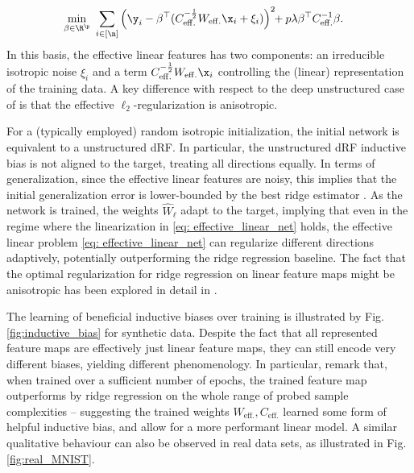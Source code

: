 \begin{align}
    \label{eq:def:erm_equiv}
    \underset{\beta\in\R^{\p}}{\min}~&\sum\limits_{i\in[\n]}\left(\y_{i}-\beta^\top(C_{\mathrm{eff.}}^{-\frac{1}{2}}W_{\mathrm{eff.}}\x_{i}+\xi_i)\right)^{2}\!\! +p\lambda\beta^{\top}C^{-1}_{\mathrm{eff.}}\beta.\notag
\end{align}
In this basis, the effective linear features has two components: an irreducible isotropic noise $\xi_{i}$ and a term $C^{-\frac{1}{2}}_{\mathrm{eff.}}W_{\mathrm{eff.}}\x_{i}$ controlling the (linear) representation of the training data. A key difference with respect to the deep unstructured case of \cite{schroder2023deterministic} is that the effective $\ell_2$-regularization is anisotropic.

For a (typically employed) random isotropic initialization, the initial network is equivalent to a unstructured dRF. In particular, the unstructured dRF inductive bias \cite{Jacot2020} is not aligned to the target, treating all directions equally. In terms of generalization, since the effective linear features are noisy, this implies that the initial generalization error is lower-bounded by the best ridge estimator \cite{schroder2023deterministic}. As the network is trained, the weights $\hat{W}_{\ell}$ adapt to the target, implying that even in the regime where the linearization in \cref{eq: effective_linear_net} holds, the effective linear problem \cref{eq: effective_linear_net} can regularize different directions adaptively, potentially outperforming the ridge regression baseline. The fact that the optimal regularization for ridge regression on linear feature maps might be anisotropic has been explored in detail in \cite{Wu2020OnTO}. 

 
The learning of beneficial inductive biases over training is illustrated by Fig.\,\ref{fig:inductive_bias} for synthetic data. Despite the fact that all represented feature maps are effectively just linear feature maps, they can still encode very different biases, yielding different phenomenology. In particular, remark that, when trained over a sufficient number of epochs, the trained feature map outperforms by ridge regression on the whole range of probed sample complexities -- suggesting the trained weights $W_{\mathrm{eff.}},C_{\mathrm{eff.}}$ learned some form of helpful inductive bias, and allow for a more performant linear model. A similar qualitative behaviour can also be observed in real data sets, as illustrated in Fig.\ref{fig:real_MNIST}.


